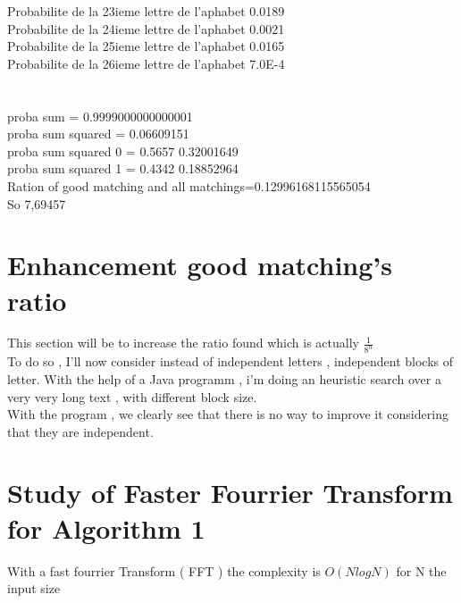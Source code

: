 \documentclass{article}
\begin{document}
Probabilite de la 23ieme lettre de l'aphabet 0.0189\\
Probabilite de la 24ieme lettre de l'aphabet 0.0021\\
Probabilite de la 25ieme lettre de l'aphabet 0.0165\\
Probabilite de la 26ieme lettre de l'aphabet 7.0E-4\\
\\
\\
proba sum = 0.9999000000000001\\
proba sum squared = 0.06609151\\
proba sum squared 0 = 0.5657 0.32001649\\
proba sum squared 1 = 0.4342 0.18852964\\
Ration of good matching and all matchings=0.12996168115565054\\
So 7,69457

\section{Enhancement good matching's ratio}

This section will be to increase the ratio found which is actually $\frac{1}{8^n}$\\
To do so , I'll now consider instead of independent letters , independent blocks of letter.
With the help of a Java programm , i'm doing an heuristic search over a very very long text , with different block size.\\
With the program , we clearly see that there is no way to improve it considering that they are independent.\\

\section{Study of Faster Fourrier Transform for Algorithm 1}
With a fast fourrier Transform ( FFT ) the complexity is $O(NlogN)$ for N the input size\\
\end{document}
